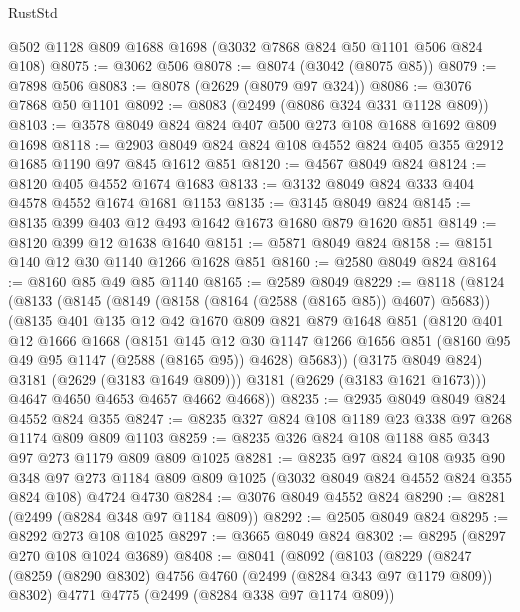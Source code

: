 \begin{lexlean}{RustStd}
\begin{coremodule}
    @502
    @1128
    @809
    @1688
    @1698
    (@3032 @7868 @824 @50 @1101 @506 @824 @108)
@8075 := @3062 @506
@8078 := @8074 (@3042 (@8075 @85))
@8079 := @7898 @506
@8083 := @8078 (@2629 (@8079 @97 @324))
@8086 := @3076 @7868 @50 @1101
@8092 := @8083 (@2499 (@8086 @324 @331 @1128 @809))
@8103 := @3578 @8049 @824 @824 @407 @500 @273 @108 @1688 @1692 @809 @1698
@8118 := @2903 @8049 @824 @824 @108 @4552 @824 @405 @355 @2912 @1685 @1190 @97 @845 @1612 @851
@8120 := @4567 @8049 @824
@8124 := @8120 @405 @4552 @1674 @1683
@8133 := @3132 @8049 @824 @333 @404 @4578 @4552 @1674 @1681 @1153
@8135 := @3145 @8049 @824
@8145 := @8135 @399 @403 @12 @493 @1642 @1673 @1680 @879 @1620 @851
@8149 := @8120 @399 @12 @1638 @1640
@8151 := @5871 @8049 @824
@8158 := @8151 @140 @12 @30 @1140 @1266 @1628 @851
@8160 := @2580 @8049 @824
@8164 := @8160 @85 @49 @85 @1140
@8165 := @2589 @8049
@8229 := @8118
    (@8124
      (@8133
        (@8145
          (@8149 (@8158 (@8164 (@2588 (@8165 @85)) @4607) @5683))
          (@8135
            @401
            @135
            @12
            @42
            @1670
            @809
            @821
            @879
            @1648
            @851
            (@8120
              @401
              @12
              @1666
              @1668
              (@8151
                @145
                @12
                @30
                @1147
                @1266
                @1656
                @851
                (@8160 @95 @49 @95 @1147 (@2588 (@8165 @95)) @4628)
                @5683))
            (@3175 @8049 @824)
            @3181
            (@2629 (@3183 @1649 @809)))
          @3181
          (@2629 (@3183 @1621 @1673)))
        @4647
        @4650
        @4653
        @4657
        @4662
        @4668))
@8235 := @2935 @8049 @8049 @824 @4552 @824 @355
@8247 := @8235 @327 @824 @108 @1189 @23 @338 @97 @268 @1174 @809 @809 @1103
@8259 := @8235 @326 @824 @108 @1188 @85 @343 @97 @273 @1179 @809 @809 @1025
@8281 := @8235
    @97
    @824
    @108
    @935
    @90
    @348
    @97
    @273
    @1184
    @809
    @809
    @1025
    (@3032 @8049 @824 @4552 @824 @355 @824 @108)
    @4724
    @4730
@8284 := @3076 @8049 @4552 @824
@8290 := @8281 (@2499 (@8284 @348 @97 @1184 @809))
@8292 := @2505 @8049 @824
@8295 := @8292 @273 @108 @1025
@8297 := @3665 @8049 @824
@8302 := @8295 (@8297 @270 @108 @1024 @3689)
@8408 := @8041
    (@8092
      (@8103
        (@8229
          (@8247
            (@8259 (@8290 @8302) @4756 @4760 (@2499 (@8284 @343 @97 @1179 @809)) @8302)
            @4771
            @4775
            (@2499 (@8284 @338 @97 @1174 @809))

\end{coremodule}
\end{lexlean}
